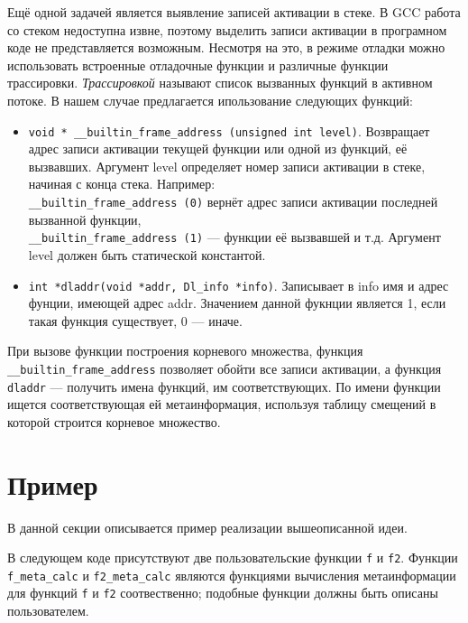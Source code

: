 Ещё одной задачей является выявление записей активации в стеке. В GCC работа со стеком недоступна извне, поэтому выделить записи активации в програмном коде не представляется возможным. Несмотря на это, в режиме отладки можно использовать встроенные отладочные функции и различные функции трассировки. \emph{Трассировкой} называют список вызванных функций в активном потоке. В нашем случае предлагается ипользование следующих функций:
\begin{itemize}
\item \lstinline{void * __builtin_frame_address (unsigned int level)}. Возвращает адрес записи активации текущей функции или одной из функций, её вызвавших. Аргумент level определяет номер записи активации в стеке, начиная с конца стека. Например:\\
\lstinline{__builtin_frame_address (0)} вернёт адрес записи активации последней вызванной функции,\\
\lstinline{__builtin_frame_address (1)} --- функции её вызвавшей и т.д. Аргумент level должен быть статической константой.
\item \lstinline{int *dladdr(void *addr, Dl_info *info)}. Записывает в info имя и адрес фунции, имеющей адрес addr. Значением данной фукнции является 1, если такая функция существует, 0 --- иначе.
\end{itemize}
При вызове функции построения корневого множества, функция \lstinline{__builtin_frame_address} позволяет обойти все записи активации, а функция \lstinline{dladdr} --- получить имена функций, им соответствующих. По имени функции ищется соответствующая ей метаинформация, используя таблицу смещений в которой строится корневое множество.

\section{Пример}
В данной секции описывается пример реализации вышеописанной идеи.

В следующем коде присутствуют две пользовательские функции \lstinline{f} и \lstinline{f2}. Функции
\lstinline{f_meta_calc} и \lstinline{f2_meta_calc} являются функциями вычисления метаинформации для функций
\lstinline{f} и \lstinline{f2} соотвественно; подобные функции должны быть описаны пользователем.


